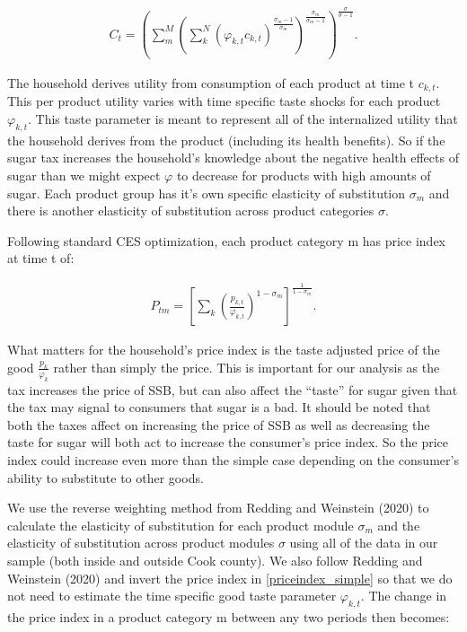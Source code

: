 \documentclass[12pt]{article}
\begin{document}
\begin{align}
	C_t = \left( \sum_m^M \left( \sum_k^N (\varphi_{k,t} c_{k,t})^{\frac{\sigma_m-1}{\sigma_m}}  \right)^{\frac{\sigma_m}{\sigma_m-1}} \right)^{\frac{\sigma}{\sigma-1}}.
\end{align}

The household derives utility from consumption of each product at time t $c_{k,t}$. This per product utility varies with time specific taste shocks for each product $\varphi_{k,t}$. This taste parameter is meant to represent all of the internalized utility that the household derives from the product (including its health benefits). So if the sugar tax increases the household's knowledge about the negative health effects of sugar than we might expect $\varphi$ to decrease for products with high amounts of sugar. Each product group has it's own specific elasticity of substitution $\sigma_m$ and there is another elasticity of substitution across product categories $\sigma$.

Following standard CES optimization, each product category m has price index at time t of:

\begin{align}
    P_{tm} = \left[ \sum_k \left( \frac{p_{k,t}}{\varphi_{k,t}}  \right)^{1-\sigma_m}  \right]^{\frac{1}{1-\sigma_m}}. \label{priceindex_simple}
\end{align}

What matters for the household's price index is the taste adjusted price of the good $\frac{p_k}{\varphi_k}$ rather than simply the price. This is important for our analysis as the tax increases the price of SSB, but can also affect the ``taste'' for sugar given that the tax may signal to consumers that sugar is a bad. It should be noted that both the taxes affect on increasing the price of SSB as well as decreasing the taste for sugar will both act to increase the consumer's price index. So the price index could increase even more than the simple case depending on the consumer's ability to substitute to other goods.

We use the reverse weighting method from Redding and Weinstein (2020) %
to calculate the elasticity of substitution for each product module $\sigma_m$  and the elasticity of substitution across product modules $\sigma$ using all of the data in our sample (both inside and outside Cook county). We also follow Redding and Weinstein (2020) %
and invert the price index in \eqref{priceindex_simple} so that we do not need to estimate the time specific good taste parameter $\varphi_{k,t}$. The change in the price index in a product category m between any two periods then becomes:
\end{document}
